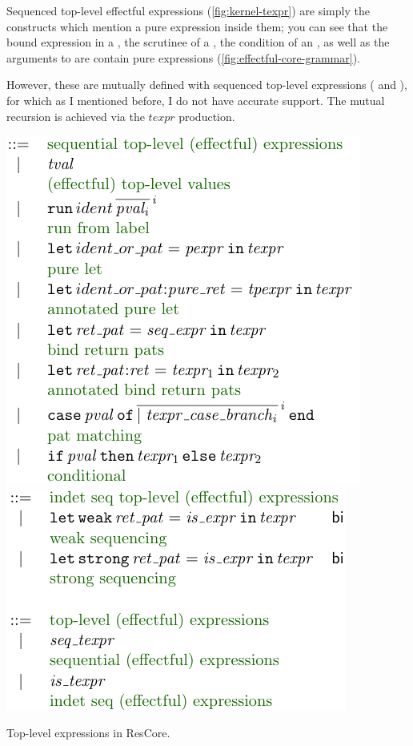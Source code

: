 Sequenced top-level effectful expressions (\cref{fig:kernel-texpr}) are
simply the constructs which mention a pure expression inside them; you can see
that the bound expression in a , the scrutinee of a
, the condition of an , as well as the
arguments to  are contain pure expressions
(\cref{fig:effectful-core-grammar}).

However, these are mutually defined with  sequenced
top-level expressions ( and ), for
which as I mentioned before, I do not have accurate support. The mutual
recursion is achieved via the $\mathit{texpr}$ production.

\begin{marginfigure}
    \includegraphics{figures/kernel-seq-texpr}
    \includegraphics{figures/kernel-texpr}
    \caption{Top-level expressions in ResCore.}\label{fig:kernel-texpr}
\end{marginfigure}

